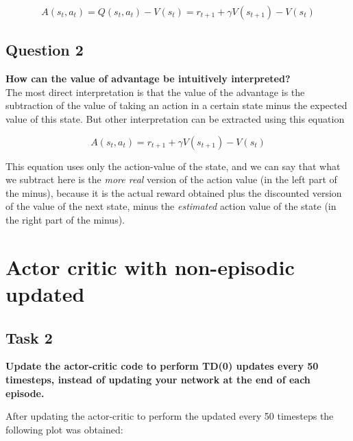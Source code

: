 \documentclass[12pt]{article}
\begin{document}
\begin{equation}
    A(s_t, a_t) = Q(s_t, a_t) - V(s_t) = r_{t+1} + \gamma V(s_{t+1}) - V(s_t)
\end{equation}

\subsection{Question 2}
\textbf{How can the value of advantage be intuitively interpreted?} \\

The most direct interpretation is that the value of the advantage is the subtraction of the value of taking an action in a certain state minus the expected value of this state. But other interpretation can be extracted using this equation

\begin{equation}
    A(s_t, a_t) = r_{t+1} + \gamma V(s_{t+1}) - V(s_t)
\end{equation}

This equation uses only the action-value of the state, and we can say that what we subtract here is the \textit{more real} version of the action value (in the left part of the minus), because it is the actual reward obtained plus the discounted version of the value of the next state, minus the \textit{estimated} action value of the state (in the right part of the minus).

\section{Actor critic with non-episodic updated}

\subsection{Task 2}
\textbf{Update the actor-critic code to perform TD(0) updates every 50 timesteps, instead of updating your network at the end of each episode. }

After updating the actor-critic to perform the updated every 50 timesteps the following plot was obtained:
\end{document}
